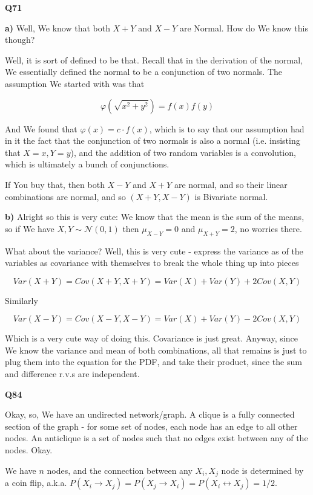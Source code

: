 \documentclass{article}
\begin{document}
			\hfill
			
		\textbf{Q71}
		
			\textbf{a)} Well, We know that both $X+Y$ and $X-Y$ are Normal. How do We know this though?
			
			Well, it is sort of defined to be that. Recall that in the derivation of the normal, We essentially defined the normal to be a conjunction of two normals. The assumption We started with was that 
			
			\[\varphi(\sqrt{x^2+y^2}) = f(x)f(y)  \]
			
			And We found that $\varphi(x) = c\cdot f(x)$, which is to say that our assumption had in it the fact that the conjunction of two normals is also a normal (i.e. insisting that $X=x, Y=y$), and the addition of two random variables is a convolution, which is ultimately a bunch of conjunctions.
			
			If You buy that, then both $X-Y$ and $X+Y$ are normal, and so their linear combinations are normal, and so $(X+Y, X-Y)$ is Bivariate normal.
			
			\textbf{b)} Alright so this is very cute: We know that the mean is the sum of the means, so if We have $X, Y\sim\mathcal{N}(0, 1)$ then $\mu_{X-Y}=0$ and $\mu_{X+Y}=2$, no worries there.
			
			What about the variance? Well, this is very cute - express the variance as of the variables as covariance with themselves to break the whole thing up into pieces
			
			\[ Var(X+Y) = Cov(X+Y, X+Y) = Var(X)+Var(Y)+2Cov(X,Y) \]
			
			Similarly
			
			\[ Var(X-Y) = Cov(X-Y, X-Y) = Var(X)+Var(Y)-2Cov(X,Y) \]
			
			Which is a very cute way of doing this. Covariance is just great. Anyway, since We know the variance and mean of both combinations, all that remains is just to plug them into the equation for the PDF, and take their product, since the sum and difference r.v.s are independent.
			
			\hfill
			
		\textbf{Q84}
		
			Okay, so, We have an undirected network/graph. A clique is a fully connected section of the graph - for some set of nodes, each node has an edge to all other nodes. An anticlique is a set of nodes such that no edges exist between any of the nodes. Okay.
			
			We have $n$ nodes, and the connection between any $X_i, X_j$ node is determined by a coin flip, a.k.a. $P(X_i\to X_j) = P(X_j\to X_i) = P(X_i \leftrightarrow X_j) = 1/2$. 
			
\end{document}
